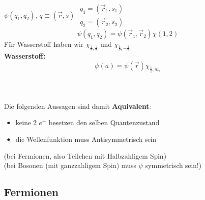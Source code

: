 $ \psi(q_1, q_2) $, $ q \equiv (\vec{r},s) $ $ \begin{array}{c}
q_1 = (\vec{r}_1 , s_1) \\
q_2 = (\vec{r}_2 , s_2)
\end{array} $
\begin{equation*}
\psi(q_1, q_2) = \psi(\vec{r}_1, \vec{r}_2) \chi(1,2)
\end{equation*}
Für Wasserstoff haben wir $ \chi_{\frac{1}{2}, \frac{1}{2}} $ und $ \chi_{\frac{1}{2}, - \frac{1}{2}} $\\
\textbf{Wasserstoff:}
\begin{equation*}
\psi(a) = \psi(\vec{r}) \chi_{\frac{1}{2}, m_s}
\end{equation*}
\\
\\
\\
Die folgenden Aussagen sind damit \textbf{Aquivalent}:
\begin{itemize}
	\item keine 2 $ e^- $ besetzen den selben Quantenzustand
	\item die Wellenfunktion muss Antisymmetrisch sein
\end{itemize}
(bei Fermionen, also Teilchen mit Halbzahligem Spin)\\
(bei Bosonen (mit ganzzahligem Spin) muss $ \psi $ symmetrisch sein!)

\subsection{Fermionen}

